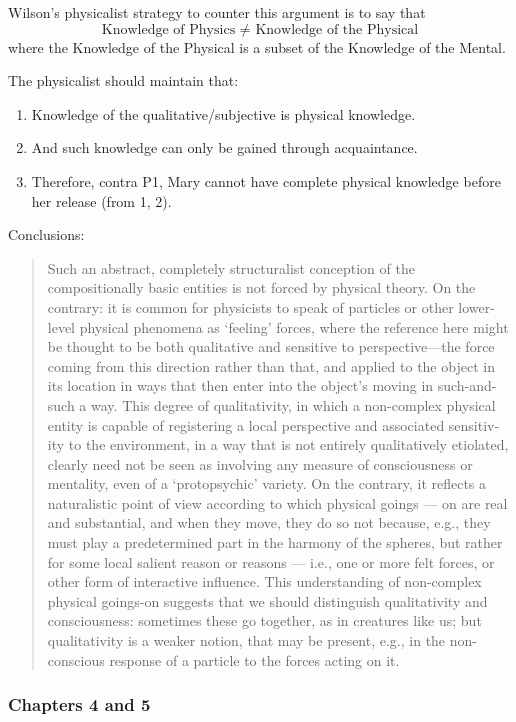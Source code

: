 \documentclass{article}
\newcommand{\tx}[1]{\text{#1}}
\begin{document}
Wilson's physicalist strategy to counter this argument is to say that
\[ \tx{Knowledge of Physics } \neq \tx{ Knowledge of the Physical} \]
where the Knowledge of the Physical is a subset of the Knowledge of the Mental.

The physicalist should maintain that:
\begin{enumerate}
\item Knowledge of the qualitative/subjective is physical knowledge.
\item And such knowledge can only be gained through acquaintance.
\item Therefore, contra P1, Mary cannot have complete physical knowledge before her release (from 1, 2).
\end{enumerate}

Conclusions:
\begin{quote}
Such an abstract, completely structuralist conception of the compositionally basic entities is not forced by physical theory. On the contrary: it is common for physicists to speak of particles or other lower-level physical phenomena as `feeling' forces, where the reference here might be thought to be both qualitative and sensitive to perspective—the force coming from this direction rather than that, and applied to the object in its location in ways that then enter into the object's moving in such-and-such a way. This degree of qualitativity, in which a non-complex physical entity is capable of registering a local perspective and associated sensitiv- ity to the environment, in a way that is not entirely qualitatively etiolated, clearly need not be seen as involving any measure of consciousness or mentality, even of a `protopsychic' variety. On the contrary, it reflects a naturalistic point of view according to which physical goings --- on are real and substantial, and when they move, they do so not because, e.g., they must play a predetermined part in the harmony of the spheres, but rather for some local salient reason or reasons --- i.e., one or more felt forces, or other form of interactive influence. This understanding of non-complex physical goings-on suggests that we should distinguish qualitativity and consciousness: sometimes these go together, as in creatures like us; but qualitativity is a weaker notion, that may be present, e.g., in the non-conscious response of a particle to the forces acting on it.
\end{quote}

\subsubsection*{Chapters 4 and 5}
\end{document}
